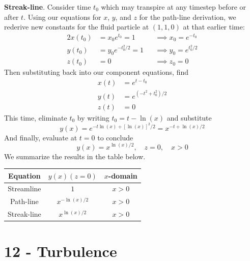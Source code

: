 \documentclass[a4paper]{article}
\begin{document}
\textbf{Streak-line}. Consider time \( t_{0} \) which may transpire at any timestep before or after \( t \). Using our equations for \( x \), \( y \), and \( z \) for the path-line derivation, we rederive new constants for the fluid particle at \( \!\left( 1,1,0 \right) \) at that earlier time:
\begin{alignat*}{2}
	x \!\left( t_{0} \right) & = x_{0}e^{t_{0}} = 1 && \implies x_{0} = e^{-t_{0}} \\
	y \!\left( t_{0} \right) & = y_{0}e^{-t_{0}^{2}/2} = 1 && \implies y_{0} = e^{t_{0}^{2}/2} \\ 
	z \!\left( t_{0} \right) & = 0 && \implies z_{0} = 0
\end{alignat*}
Then substituting back into our component equations, find
\begin{align*}
	x \!\left( t \right) & = e^{t - t_{0}} \\
	y \!\left( t \right) & = e^{\!\left( -t^{2} + t^{2}_{0} \right)/2} \\ 
	z \!\left( t \right) & = 0
\end{align*}
This time, eliminate \( t_{0} \) by writing \( t_{0} = t - \ln\!\left(x\right) \) and substitute
\[
	y \!\left( x \right) = e^{-t \ln\!\left(x\right) + \!\left[ \ln\!\left(x\right) \right]^{2}/2} = x^{-t + \ln\!\left(x\right)/2}
\]
And finally, evaluate at \( t = 0 \) to conclude
\[
	y \!\left( x \right) = x^{\ln\!\left(x\right)/2}, \quad z = 0, \quad x > 0
\]
We summarize the results in the table below.

\begin{center}
	\renewcommand{\arraystretch}{1.8}
	\setlength{\arraycolsep}{10pt}
	\begin{tabular}{|c||c|c|}
		\hline
		\rule[-1.2em]{0pt}{3em}
		Equation & \( y \!\left( x \right) (z = 0) \) & \( x \)-domain \\
		\hline\hline
		\rule[-1.2em]{0pt}{3em}
				Streamline & \( 1 \) & \( x > 0 \) \\
		\hline
		\rule[-1.2em]{0pt}{3em}
				Path-line & \( x^{-\ln\!\left(x\right)/2} \) & \( x > 0 \) \\
		\hline
		\rule[-1.2em]{0pt}{3em}
				Streak-line & \( x^{\ln\!\left(x\right)/2} \) & \( x > 0 \) \\
		\hline
	\end{tabular}
\end{center}

\newpage
\section{12 - Turbulence}
\end{document}
